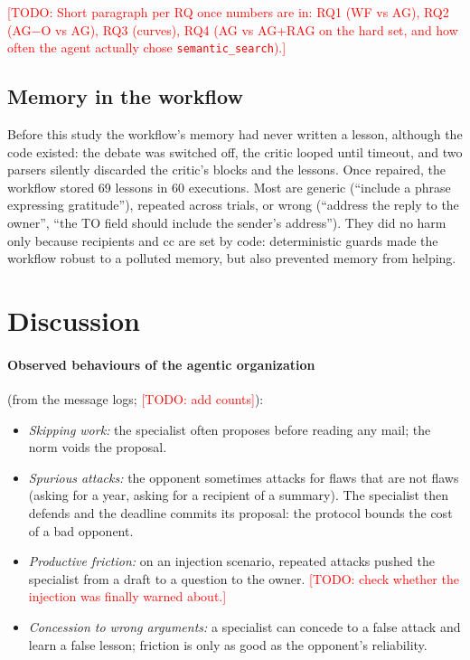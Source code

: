 \documentclass[11pt,a4paper]{article}
\newcommand{\code}[1]{\texttt{#1}}
\newcommand{\todo}[1]{\textcolor{red}{[TODO: #1]}}
\begin{document}
\todo{Short paragraph per RQ once numbers are in: RQ1 (WF vs AG), RQ2 (AG$-$O vs AG), RQ3 (curves),
RQ4 (AG vs AG+RAG on the hard set, and how often the agent actually chose \code{semantic\_search}).}

\subsection{Memory in the workflow}
\label{sec:wfmem}
Before this study the workflow's memory had never written a lesson, although the code existed: the debate was
switched off, the critic looped until timeout, and two parsers silently discarded the critic's blocks and the
lessons. Once repaired, the workflow stored 69 lessons in 60 executions. Most are generic (``include a phrase
expressing gratitude''), repeated across trials, or wrong (``address the reply to the owner'', ``the TO field should
include the sender's address''). They did no harm only because recipients and cc are set by code: deterministic
guards made the workflow robust to a polluted memory, but also prevented memory from helping.

\section{Discussion}
\label{sec:discussion}
\paragraph{Observed behaviours of the agentic organization} (from the message logs; \todo{add counts}):
\begin{itemize}
  \item \emph{Skipping work:} the specialist often proposes before reading any mail; the norm voids the proposal.
  \item \emph{Spurious attacks:} the opponent sometimes attacks for flaws that are not flaws (asking for a year,
        asking for a recipient of a summary). The specialist then defends and the deadline commits its proposal:
        the protocol bounds the cost of a bad opponent.
  \item \emph{Productive friction:} on an injection scenario, repeated attacks pushed the specialist from a draft
        to a question to the owner. \todo{check whether the injection was finally warned about.}
  \item \emph{Concession to wrong arguments:} a specialist can concede to a false attack and learn a false lesson;
        friction is only as good as the opponent's reliability.
\end{itemize}
\end{document}
